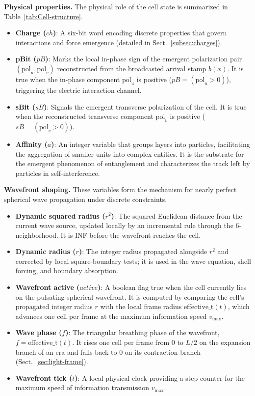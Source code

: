 \documentclass{ijuc}
\begin{document}
\medskip\noindent\textbf{Physical properties.} The physical role of the cell state is summarized in Table~\ref{tab:Cell-structure}.
\begin{itemize}
\item \textbf{Charge ($ch$)}: A six-bit word encoding discrete properties that govern interactions and force emergence (detailed in Sect.~\ref{subsec:charges}).
\item \textbf{pBit ($pB$)}: Marks the local in-phase sign of the emergent polarization pair $(\mathrm{pol}_u, \mathrm{pol}_v)$ reconstructed from the broadcasted arrival stamp $b(x)$. It is true when the in-phase component $\mathrm{pol}_u$ is positive ($pB = (\mathrm{pol}_u > 0)$), triggering the electric interaction channel.
\item \textbf{sBit ($sB$)}: Signals the emergent transverse polarization of the cell. It is true when the reconstructed transverse component $\mathrm{pol}_v$ is positive ($sB = (\mathrm{pol}_v > 0)$).
\item \textbf{Affinity ($a$)}: An integer variable that groups layers into particles, facilitating the aggregation of smaller units into complex entities. It is the substrate for the emergent phenomenon of entanglement and characterizes the track left by particles in self-interference.
\end{itemize}

\medskip\noindent\textbf{Wavefront shaping.}
These variables form the mechanism for nearly perfect spherical wave propagation under discrete constraints.
\begin{itemize}
\item \textbf{Dynamic squared radius ($r^2$)}: The squared Euclidean distance from the current wave source, updated locally by an incremental rule through the 6-neighborhood. It is $\mathrm{INF}$ before the wavefront reaches the cell.
\item \textbf{Dynamic radius ($r$)}: The integer radius propagated alongside $r^2$ and corrected by local square-boundary tests; it is used in the wave equation, shell forcing, and boundary absorption.
\item \textbf{Wavefront active ($\mathit{active}$)}: A boolean flag true when the cell currently lies on the pulsating spherical wavefront. It is computed by comparing the cell's propagated integer radius $r$ with the local frame radius $\mathrm{effective\_t}(t)$, which advances one cell per frame at the maximum information speed $v_{\max}$.
\item \textbf{Wave phase ($f$)}: The triangular breathing phase of the wavefront, $f = \mathrm{effective\_t}(t)$. It rises one cell per frame from $0$ to $L/2$ on the expansion branch of an era and falls back to $0$ on its contraction branch (Sect.~\ref{sec:light-frame}).
\item \textbf{Wavefront tick ($t$)}: A local physical clock providing a step counter for the maximum speed of information transmission $v_{\max}$.
\end{itemize}
\end{document}
